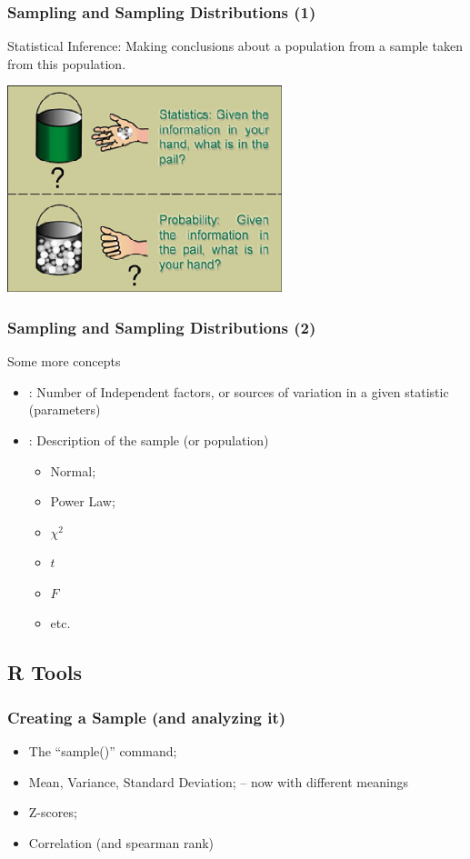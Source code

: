 \documentclass[10pt]{beamer}
\begin{document}
\begin{frame}
  \frametitle{Sampling and Sampling Distributions (1)}
  \begin{block}{}
    Statistical Inference: Making conclusions about a population from
    a sample taken from this population.
  \end{block}
  \bigskip

  \includegraphics[width=0.6\textwidth]{img/sampleandpopulation}
\end{frame}

\begin{frame}
  \frametitle{Sampling and Sampling Distributions (2)}
  \begin{block}{Some more concepts}
    \begin{itemize}
      \item {}: Number of Independent
        factors, or sources of variation in a given statistic
        (parameters)
      \item {}: Description of the sample (or
        population)
        \begin{itemize}
        \item Normal;
        \item Power Law;
        \item $\chi^2$
        \item $t$
        \item $F$
        \item etc.
        \end{itemize}
    \end{itemize}
  \end{block}
\end{frame}

\subsection{R Tools}
\begin{frame}
  \frametitle{Creating a Sample (and analyzing it)}
  \begin{itemize}
  \item The ``sample()'' command;
  \item Mean, Variance, Standard Deviation; -- now with different meanings
  \item Z-scores;
  \item Correlation (and spearman rank)
  \end{itemize}
\end{frame}
\end{document}
